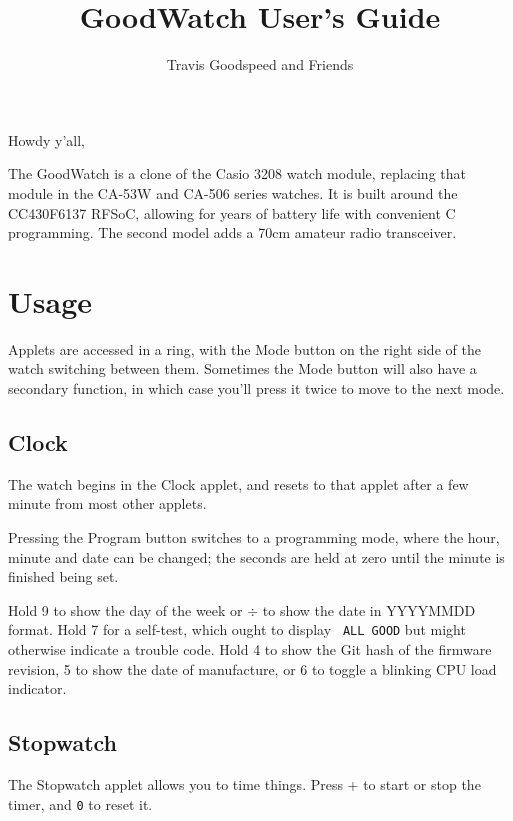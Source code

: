 \documentclass{article}
\begin{document}


\title{GoodWatch User's Guide}
\author{Travis Goodspeed and Friends}
\maketitle


\begin{multicols}{2}
\noindent
Howdy y'all,

The GoodWatch is a clone of the Casio 3208 watch module, replacing
that module in the CA-53W and CA-506 series watches.  It is built
around the CC430F6137 RFSoC, allowing for years of battery life with
convenient C programming.  The second model adds a 70cm amateur radio
transceiver.

\section{Usage}

Applets are accessed in a ring, with the Mode button on the right side
of the watch switching between them.  Sometimes the Mode button will
also have a secondary function, in which case you'll press it twice to
move to the next mode.

\subsection*{Clock}

The watch begins in the Clock applet, and resets to that applet after
a few minute from most other applets.

Pressing the Program button switches to a programming mode, where the
hour, minute and date can be changed; the seconds are held at zero
until the minute is finished being set.

Hold 9 to show the day of the week or $\div$ to show the date in
YYYYMMDD format.  Hold 7 for a self-test, which ought to display {\tt
  ALL GOOD} but might otherwise indicate a trouble code.  Hold 4 to
show the Git hash of the firmware revision, 5 to show the date of
manufacture, or 6 to toggle a blinking CPU load indicator.

\subsection*{Stopwatch}

The Stopwatch applet allows you to time things.  Press + to start or
stop the timer, and {\tt 0} to reset it.


\end{multicols}
\end{document}
